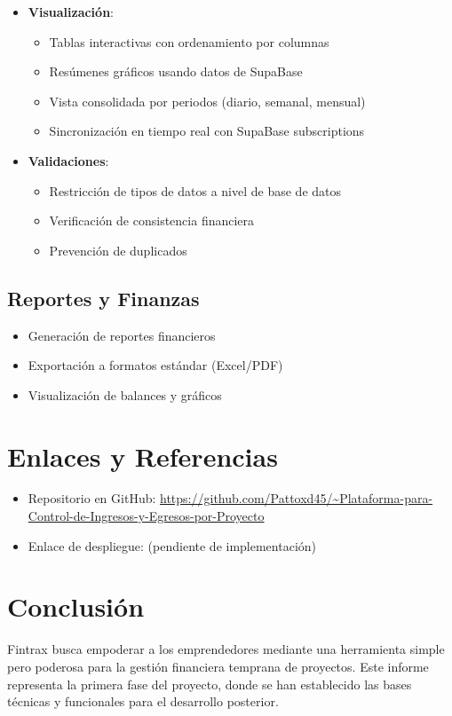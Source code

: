 \documentclass[12pt, a4paper]{article}
\begin{document}
\begin{itemize}
    \item \textbf{Visualización}:
    \begin{itemize}
        \item Tablas interactivas con ordenamiento por columnas
        \item Resúmenes gráficos usando datos de SupaBase
        \item Vista consolidada por periodos (diario, semanal, mensual)
        \item Sincronización en tiempo real con SupaBase subscriptions
    \end{itemize}
    
    \item \textbf{Validaciones}:
    \begin{itemize}
        \item Restricción de tipos de datos a nivel de base de datos
        \item Verificación de consistencia financiera
        \item Prevención de duplicados
    \end{itemize}
\end{itemize}

\subsection{Reportes y Finanzas}
\begin{itemize}
    \item Generación de reportes financieros
    \item Exportación a formatos estándar (Excel/PDF)
    \item Visualización de balances y gráficos
\end{itemize}

\section{Enlaces y Referencias}
\begin{itemize}
    \item Repositorio en GitHub: \url{https://github.com/Pattoxd45/~Plataforma-para-Control-de-Ingresos-y-Egresos-por-Proyecto}
    \item Enlace de despliegue: (pendiente de implementación)
\end{itemize}

\section{Conclusión}
Fintrax busca empoderar a los emprendedores mediante una herramienta simple pero poderosa para la gestión financiera temprana de proyectos. Este informe representa la primera fase del proyecto, donde se han establecido las bases técnicas y funcionales para el desarrollo posterior.
\end{document}
